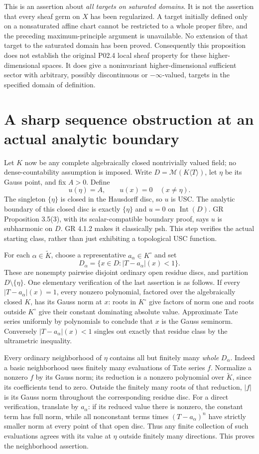 \documentclass[11pt]{article}
\theoremstyle{remark}
\newcommand{\Int}{\operatorname{Int}}
\begin{document}
This is an assertion about \emph{all targets on saturated domains}.
It is not the assertion that every sheaf germ on $X$ has been regularized.
A target initially defined only on a nonsaturated affine chart cannot
be restricted to a whole proper fibre, and the preceding maximum-principle
argument is unavailable. No extension of that target to the saturated
domain has been proved. Consequently this proposition does not establish
the original P02.4 local sheaf property for these higher-dimensional
spaces. It does give a noninvariant higher-dimensional sufficient sector
with arbitrary, possibly discontinuous or $-\infty$-valued, targets in
the specified domain of definition.

\section{A sharp sequence obstruction at an actual analytic boundary}
Let $K$ now be any complete algebraically closed nontrivially valued
field; no dense-countability assumption is imposed. Write
$D=\mathcal M(K\langle T\rangle)$, let $\eta$ be its Gauss point, and
fix $A>0$. Define
\[
 u(\eta)=A,\qquad u(x)=0\quad(x\ne\eta).
\]
The singleton $\{\eta\}$ is closed in the Hausdorff disc, so $u$ is USC.
The analytic boundary of this closed disc is exactly $\{\eta\}$ and
$u=0$ on $\Int(D)$. GR Proposition 3.5(3), with its scalar-compatible
boundary proof, says $u$ is subharmonic on $D$. GR 4.1.2 makes it
classically psh. This step verifies the actual starting class, rather
than just exhibiting a topological USC function.

For each $\alpha\in\widetilde K$, choose a representative
$a_\alpha\in K^\circ$ and set
\[
 D_\alpha=\{x\in D:|T-a_\alpha|(x)<1\}.
\]
These are nonempty pairwise disjoint ordinary open residue discs, and
partition $D\setminus\{\eta\}$. One elementary verification of the last
assertion is as follows. If every $|T-a_\alpha|(x)=1$, every nonzero
polynomial, factored over the algebraically closed $K$, has its Gauss
norm at $x$: roots in $K^\circ$ give factors of norm one and roots
outside $K^\circ$ give their constant dominating absolute value.
Approximate Tate series uniformly by polynomials to conclude that $x$
is the Gauss seminorm. Conversely $|T-a_\alpha|(x)<1$ singles out exactly
that residue class by the ultrametric inequality.

Every ordinary neighborhood of $\eta$ contains all but finitely many
\emph{whole} $D_\alpha$. Indeed a basic neighborhood uses finitely many
evaluations of Tate series $f$. Normalize a nonzero $f$ by its Gauss norm;
its reduction is a nonzero polynomial over $\widetilde K$, since its
coefficients tend to zero. Outside the finitely many roots of that
reduction, $|f|$ is its Gauss norm throughout the corresponding residue
disc. For a direct verification, translate by $a_\alpha$: if its reduced
value there is nonzero, the constant term has full norm, while all
nonconstant terms times $(T-a_\alpha)^n$ have strictly smaller norm
at every point of that open disc. Thus any finite collection of such
evaluations agrees with its value at $\eta$ outside finitely many
directions. This proves the neighborhood assertion.
\end{document}
